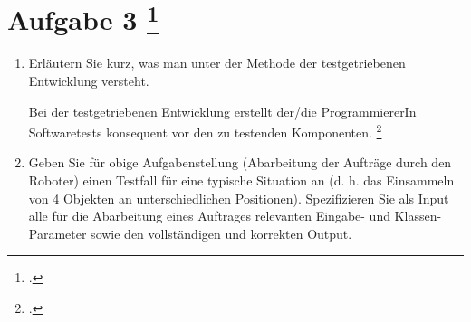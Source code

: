 \documentclass{lehramt-informatik-aufgabe}
\begin{document}
\section{Aufgabe 3
\footcite{examen:66116:2019:03}}

\begin{enumerate}

\item Erläutern Sie kurz, was man unter der Methode der testgetriebenen
Entwicklung versteht.

\begin{liAntwort}
Bei der testgetriebenen Entwicklung erstellt der/die ProgrammiererIn
Softwaretests konsequent vor den zu testenden Komponenten.
\footcite{wiki:testgetriebene-entwicklung}
\end{liAntwort}


\item Geben Sie für obige Aufgabenstellung (Abarbeitung der Aufträge
durch den Roboter) einen Testfall für eine typische Situation an (d. h.
das Einsammeln von 4 Objekten an unterschiedlichen Positionen).
Spezifizieren Sie als Input alle für die Abarbeitung eines Auftrages
relevanten Eingabe- und Klassen-Parameter sowie den vollständigen und
korrekten Output.
\end{enumerate}
\end{document}
